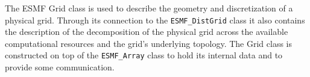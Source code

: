 %



The ESMF Grid class is used to describe the geometry and discretization
of a physical grid.  Through its connection to the {\tt ESMF\_DistGrid}
class it also contains the description of the decomposition of the 
physical grid across the available computational resources and the grid's
underlying topology. The Grid class is constructed on top of the 
{\tt ESMF\_Array} class to hold its internal data and to provide
some communication. 

\medskip

